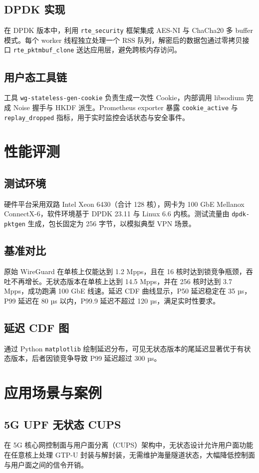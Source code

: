 \section{DPDK 实现}
在 DPDK 版本中，利用 \texttt{rte\_{}security} 框架集成 AES-NI 与 ChaCha20 多 buffer 模式。每个 worker 线程独立处理一个 RSS 队列，解密后的数据包通过零拷贝接口 \texttt{rte\_{}pktmbuf\_{}clone} 送达应用层，避免跨核内存访问。\par
\section{用户态工具链}
工具 \texttt{wg-stateless-gen-cookie} 负责生成一次性 Cookie，内部调用 libsodium 完成 Noise 握手与 HKDF 派生。Prometheus exporter 暴露 \texttt{cookie\_{}active} 与 \texttt{replay\_{}dropped} 指标，用于实时监控会话状态与安全事件。\par
\chapter{性能评测}
\section{测试环境}
硬件平台采用双路 Intel Xeon 6430（合计 128 核），网卡为 100 GbE Mellanox ConnectX-6，软件环境基于 DPDK 23.11 与 Linux 6.6 内核。测试流量由 \texttt{dpdk-pktgen} 生成，包长固定为 256 字节，以模拟典型 VPN 场景。\par
\section{基准对比}
原始 WireGuard 在单核上仅能达到 1.2 Mpps，且在 16 核时达到锁竞争瓶颈，吞吐不再增长。无状态版本在单核上达到 14.5 Mpps，并在 256 核时达到 3.7 Mpps，成功跑满 100 GbE 线速。延迟 CDF 曲线显示，P50 延迟稳定在 35 µs，P99 延迟在 80 µs 以内，P99.9 延迟不超过 120 µs，满足实时性要求。\par
\section{延迟 CDF 图}
通过 Python \texttt{matplotlib} 绘制延迟分布，可见无状态版本的尾延迟显著优于有状态版本，后者因锁竞争导致 P99 延迟超过 300 µs。\par
\chapter{应用场景与案例}
\section{5G UPF 无状态 CUPS}
在 5G 核心网控制面与用户面分离（CUPS）架构中，无状态设计允许用户面功能在任意核上处理 GTP-U 封装与解封装，无需维护海量隧道状态，大幅降低控制面与用户面之间的信令开销。\par
